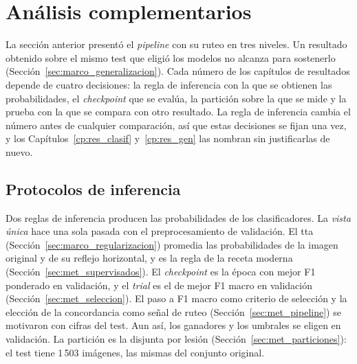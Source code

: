 
\section{Análisis complementarios}
\label{sec:met_complementarios}

La sección anterior presentó el \emph{pipeline} con su ruteo en tres niveles. Un resultado obtenido sobre el mismo test
que eligió los modelos no alcanza para sostenerlo (Sección~\ref{sec:marco_generalizacion}). Cada número de los capítulos
de resultados depende de cuatro decisiones: la regla de inferencia con la que se obtienen las probabilidades, el
\emph{checkpoint} que se evalúa, la partición sobre la que se mide y la prueba con la que se compara con otro resultado.
La regla de inferencia cambia el número antes de cualquier comparación, así que estas decisiones se fijan una vez, y los
Capítulos~\ref{cp:res_clasif} y~\ref{cp:res_gen} las nombran sin justificarlas de nuevo.

\subsection{Protocolos de inferencia}
\label{sec:met_inferencia}

Dos reglas de inferencia producen las probabilidades de los clasificadores. La \emph{vista única} hace una sola pasada
con el preprocesamiento de validación. El \gls{tta} (Sección~\ref{sec:marco_regularizacion}) promedia las
probabilidades de la imagen original y de su reflejo horizontal, y es la regla de la receta moderna
(Sección~\ref{sec:met_supervisados}). El \emph{checkpoint} es la época con mejor F1 ponderado en validación, y el
\emph{trial} es el de mejor F1 macro en validación (Sección~\ref{sec:met_seleccion}). El paso a F1 macro como criterio de
selección y la elección de la concordancia como señal de ruteo (Sección~\ref{sec:met_pipeline}) se motivaron con cifras
del test. Aun así, los ganadores y los umbrales se eligen en validación.
La partición es la disjunta por lesión (Sección~\ref{sec:met_particiones}): el test tiene 1\,503 imágenes, las mismas
del conjunto original.

